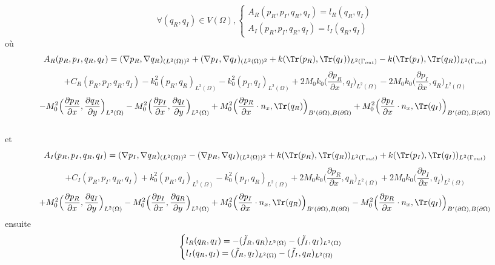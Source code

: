 \[\forall (q_R,q_I)\in V(\Omega), \begin{cases}
    A_R(p_R,p_I,q_R,q_I) = l_R(q_R,q_I)\\
    A_I(p_R,p_I,q_R,q_I) = l_I(q_R,q_I)
\end{cases}\]
où
\\
\[
    A_R(p_R,p_I,q_R,q_I) = (\nabla p_R, \nabla q_R)_{(L^2(\Omega))^2}+(\nabla p_I, \nabla q_I)_{(L^2(\Omega))^2} + k(\Tr(p_R),\Tr(q_I))_{L^2(\Gamma_{out})}-k(\Tr(p_I),\Tr(q_R))_{L^2(\Gamma_{out})}\]
    \[+ C_R(p_R,p_I,q_R,q_I) -k_0^2(p_R,q_R)_{L^2(\Omega)}-k_0^2(p_I,q_I)_{L^2(\Omega)} + 2M_0k_0\Big(\frac{\partial p_R}{\partial x}, q_I\Big)_{L^2(\Omega)}-2M_0k_0\Big(\frac{\partial p_I}{\partial x}, q_R\Big)_{L^2(\Omega)} \]
\[-M_0^2\Big(\frac{\partial p_R}{\partial x},\frac{\partial q_R}{\partial y}\Big)_{L^2(\Omega)}-M_0^2\Big(\frac{\partial p_I}{\partial x},\frac{\partial q_I}{\partial y}\Big)_{L^2(\Omega)}+ M_0^2\Big(\frac{\partial p_R}{\partial x}\cdot n_x,\Tr(q_R)\Big)_{B'(\partial \Omega),B(\partial \Omega)}+ M_0^2\Big(\frac{\partial p_I}{\partial x}\cdot n_x,\Tr(q_I)\Big)_{B'(\partial \Omega),B(\partial \Omega)}
\]
\\
et
\\
    \[A_I(p_R,p_I,q_R,q_I) = (\nabla p_I, \nabla q_R)_{(L^2(\Omega))^2}-(\nabla p_R, \nabla q_I)_{(L^2(\Omega))^2} + k(\Tr(p_R),\Tr(q_R))_{L^2(\Gamma_{out})}+k(\Tr(p_I),\Tr(q_I))_{L^2(\Gamma_{out})}\]
    \[+ C_I(p_R,p_I,q_R,q_I) +k_0^2(p_R,q_I)_{L^2(\Omega)}-k_0^2(p_I,q_R)_{L^2(\Omega)} + 2M_0k_0\Big(\frac{\partial p_R}{\partial x}, q_R\Big)_{L^2(\Omega)} +2M_0k_0\Big(\frac{\partial p_I}{\partial x}, q_I\Big)_{L^2(\Omega)}\]
\[+M_0^2\Big(\frac{\partial p_R}{\partial x},\frac{\partial q_I}{\partial y}\Big)_{L^2(\Omega)}-M_0^2\Big(\frac{\partial p_I}{\partial x},\frac{\partial q_R}{\partial y}\Big)_{L^2(\Omega)}+ M_0^2\Big(\frac{\partial p_I}{\partial x}\cdot n_x,\Tr(q_R)\Big)_{B'(\partial \Omega),B(\partial \Omega)}- M_0^2\Big(\frac{\partial p_R}{\partial x}\cdot n_x,\Tr(q_I)\Big)_{B'(\partial \Omega),B(\partial \Omega)}
\]
ensuite
\[\begin{cases}
    l_R(q_R,q_I) = -(\Tilde{f}_R,q_R)_{L^2(\Omega)}-(\Tilde{f}_I,q_I)_{L^2(\Omega)} \\
    l_I(q_R,q_I) = (\Tilde{f}_R,q_I)_{L^2(\Omega)}-(\Tilde{f}_I,q_R)_{L^2(\Omega)}
\end{cases}\]

